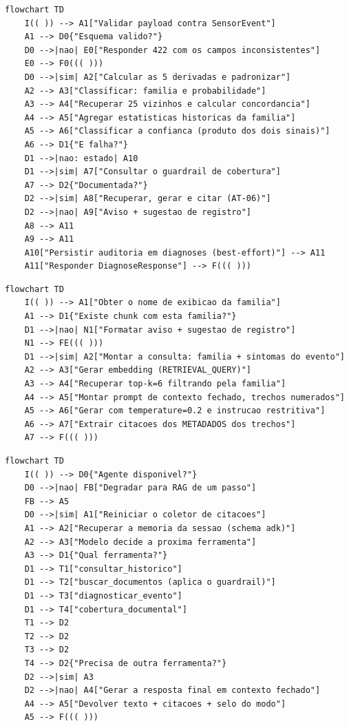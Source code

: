 \begin{lstlisting}[language=mermaid, caption={AT-05 --- diagnóstico de um novo evento}, label={lst:mmat05}]
flowchart TD
    I(( )) --> A1["Validar payload contra SensorEvent"]
    A1 --> D0{"Esquema valido?"}
    D0 -->|nao| E0["Responder 422 com os campos inconsistentes"]
    E0 --> F0((( )))
    D0 -->|sim| A2["Calcular as 5 derivadas e padronizar"]
    A2 --> A3["Classificar: familia e probabilidade"]
    A3 --> A4["Recuperar 25 vizinhos e calcular concordancia"]
    A4 --> A5["Agregar estatisticas historicas da familia"]
    A5 --> A6["Classificar a confianca (produto dos dois sinais)"]
    A6 --> D1{"E falha?"}
    D1 -->|nao: estado| A10
    D1 -->|sim| A7["Consultar o guardrail de cobertura"]
    A7 --> D2{"Documentada?"}
    D2 -->|sim| A8["Recuperar, gerar e citar (AT-06)"]
    D2 -->|nao| A9["Aviso + sugestao de registro"]
    A8 --> A11
    A9 --> A11
    A10["Persistir auditoria em diagnoses (best-effort)"] --> A11
    A11["Responder DiagnoseResponse"] --> F((( )))
\end{lstlisting}

\begin{lstlisting}[language=mermaid, caption={AT-06 --- \textit{guardrail} e geração da prescrição}, label={lst:mmat06}]
flowchart TD
    I(( )) --> A1["Obter o nome de exibicao da familia"]
    A1 --> D1{"Existe chunk com esta familia?"}
    D1 -->|nao| N1["Formatar aviso + sugestao de registro"]
    N1 --> FE((( )))
    D1 -->|sim| A2["Montar a consulta: familia + sintomas do evento"]
    A2 --> A3["Gerar embedding (RETRIEVAL_QUERY)"]
    A3 --> A4["Recuperar top-k=6 filtrando pela familia"]
    A4 --> A5["Montar prompt de contexto fechado, trechos numerados"]
    A5 --> A6["Gerar com temperature=0.2 e instrucao restritiva"]
    A6 --> A7["Extrair citacoes dos METADADOS dos trechos"]
    A7 --> F((( )))
\end{lstlisting}

\begin{lstlisting}[language=mermaid, caption={AT-07 --- conversa com o agente}, label={lst:mmat07}]
flowchart TD
    I(( )) --> D0{"Agente disponivel?"}
    D0 -->|nao| FB["Degradar para RAG de um passo"]
    FB --> A5
    D0 -->|sim| A1["Reiniciar o coletor de citacoes"]
    A1 --> A2["Recuperar a memoria da sessao (schema adk)"]
    A2 --> A3["Modelo decide a proxima ferramenta"]
    A3 --> D1{"Qual ferramenta?"}
    D1 --> T1["consultar_historico"]
    D1 --> T2["buscar_documentos (aplica o guardrail)"]
    D1 --> T3["diagnosticar_evento"]
    D1 --> T4["cobertura_documental"]
    T1 --> D2
    T2 --> D2
    T3 --> D2
    T4 --> D2{"Precisa de outra ferramenta?"}
    D2 -->|sim| A3
    D2 -->|nao| A4["Gerar a resposta final em contexto fechado"]
    A4 --> A5["Devolver texto + citacoes + selo do modo"]
    A5 --> F((( )))
\end{lstlisting}

